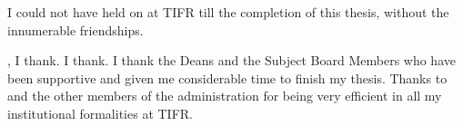 


I could not have held on at TIFR till the completion of this thesis, without the innumerable friendships.




, I thank. I thank.  I thank the Deans and the
Subject Board Members who have been supportive and given me considerable time to finish
my thesis. Thanks to and the other members of the
 administration for being very efficient 
in all my institutional formalities at TIFR.



 

